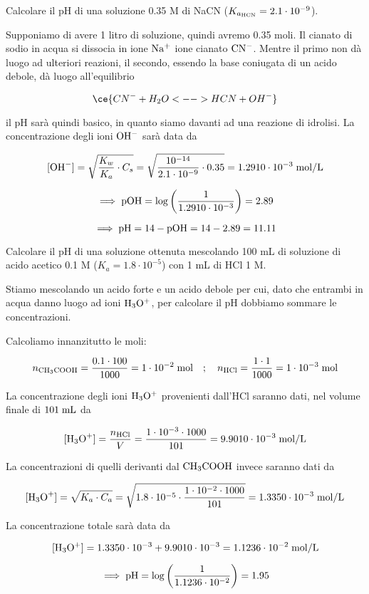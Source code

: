 \newpage

\begin{esercizio}
    Calcolare il pH di una soluzione 0.35 M di NaCN ($K_{a_{\rm HCN}} = 2.1 \cdot 10^{-9}$).
\end{esercizio}
\begin{soluzione}
    Supponiamo di avere 1 litro di soluzione, quindi avremo 0.35 moli. Il cianato di sodio in acqua si dissocia in ione $\rm Na^+$ ione cianato $\rm CN^-$. Mentre il primo non dà luogo ad ulteriori reazioni, il secondo, essendo la base coniugata di un acido debole, dà luogo all'equilibrio

$$\ce{CN^- + H_2O <--> HCN + OH^-}$$

il pH sarà quindi basico, in quanto siamo davanti ad una reazione di idrolisi. La concentrazione degli ioni $\rm OH^-$ sarà data da


$$[\text{OH}^-]
=\sqrt{\frac{K_w}{K_a}\cdot C_s}
=\sqrt{\frac{10^{-14}}{2.1 \cdot 10^{-9}} \cdot 0.35}
=1.2910 \cdot 10^{-3} \; \rm mol/L$$

$$\implies \rm pOH
=\log{\left(\frac{1}{1.2910 \cdot 10^{-3}}\right)}
=2.89$$

$$\implies \rm pH=14-pOH=14-2.89=11.11$$
\end{soluzione}

\newpage

\begin{esercizio}
    Calcolare il pH di una soluzione ottenuta mescolando 100 mL di soluzione di acido acetico 0.1 M ($K_a=1.8 \cdot 10^{-5}$) con 1 mL di HCl 1 M.
\end{esercizio}
\begin{soluzione}
    Stiamo mescolando un acido forte e un acido debole per cui, dato che entrambi in acqua danno luogo ad ioni $\rm H_3O^+$, per calcolare il pH dobbiamo sommare le concentrazioni.

Calcoliamo innanzitutto le moli:

$$n_{\rm CH_3COOH}=\frac{0.1 \cdot 100}{1000}=1 \cdot 10^{-2} \; \text{mol}
\quad;\quad
n_{\rm HCl}=\frac{1 \cdot 1}{1000}=1 \cdot 10^{-3} \; \rm mol$$

La concentrazione degli ioni $\rm H_3O^+$ provenienti dall'HCl saranno dati, nel volume finale di $101 \; \rm mL$ da

$$[\text{H}_3\text{O}^+]=\frac{n_{\rm HCl}}{V}
=\frac{1 \cdot 10^{-3} \cdot 1000}{101}
=9.9010\cdot 10^{-3} \; \rm mol/L$$

La concentrazioni di quelli derivanti dal $\rm CH_3COOH$ invece saranno dati da

$$[\text{H}_3\text{O}^+]=\sqrt{K_a \cdot C_a}
=\sqrt{1.8 \cdot 10^{-5}\cdot \frac{1 \cdot 10^{-2} \cdot 1000}{101}}
=1.3350 \cdot 10^{-3} \; \rm mol/L$$

La concentrazione totale sarà data da

$$[\rm H_3O^+]=1.3350 \cdot 10^{-3} + 9.9010\cdot 10^{-3}
=1.1236 \cdot 10^{-2} \; \rm mol/L$$

$$\implies
\rm pH=\log{\left(\frac{1}{1.1236 \cdot 10^{-2}}\right)}
=1.95$$
\end{soluzione}


